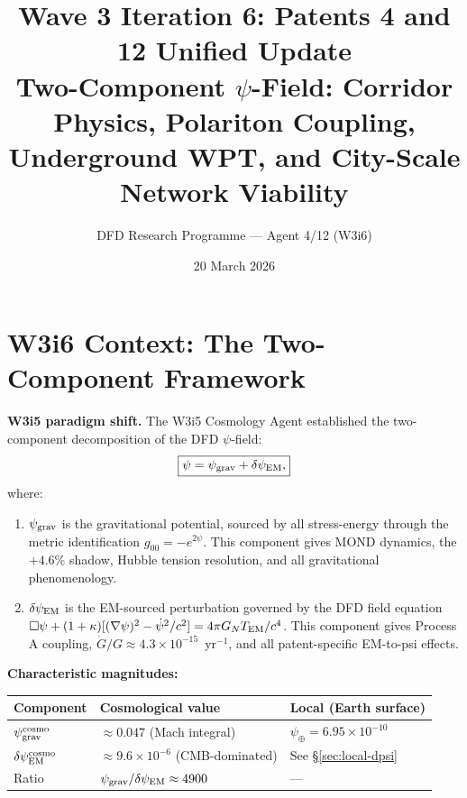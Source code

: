 \documentclass[11pt]{article}
\title{Wave 3 Iteration 6: Patents 4 and 12 Unified Update\\
\large Two-Component $\psi$-Field: Corridor Physics, Polariton Coupling,\\
Underground WPT, and City-Scale Network Viability}
\author{DFD Research Programme --- Agent 4/12 (W3i6)}
\date{20 March 2026}
\newcommand{\ee}[1]{\times 10^{#1}}
\newcommand{\psigrav}{\psi_{\rm grav}}
\newcommand{\dpsiEM}{\delta\psi_{\rm EM}}
\newcommand{\GN}{G_N}
\begin{document}
\maketitle
\tableofcontents
\newpage

\section{W3i6 Context: The Two-Component Framework}
\label{sec:context}

\noindent\textbf{W3i5 paradigm shift.} The W3i5 Cosmology Agent established the
two-component decomposition of the DFD $\psi$-field:
\begin{equation}
\boxed{\psi = \psigrav + \dpsiEM,}
\label{eq:two-component}
\end{equation}
where:
\begin{enumerate}
  \item $\psigrav$ is the gravitational potential, sourced by all stress-energy
    through the metric identification $g_{00} = -e^{2\psi}$. This component
    gives MOND dynamics, the $+4.6\%$ shadow, Hubble tension resolution,
    and all gravitational phenomenology.
  \item $\dpsiEM$ is the EM-sourced perturbation governed by the DFD field
    equation $\Box\psi + (1+\kappa)[(\nabla\psi)^2 - \dot\psi^2/c^2]
    = 4\pi \GN T_{\rm EM}/c^4$. This component gives Process A coupling,
    $\dot{G}/G \approx 4.3\ee{-15}$~yr$^{-1}$, and all patent-specific
    EM-to-psi effects.
\end{enumerate}

\noindent\textbf{Characteristic magnitudes:}
\begin{center}
\begin{tabular}{lll}
\toprule
Component & Cosmological value & Local (Earth surface) \\
\midrule
$\psigrav^{\rm cosmo}$ & $\approx 0.047$ (Mach integral) & $\psi_\oplus = 6.95\ee{-10}$ \\
$\dpsiEM^{\rm cosmo}$ & $\approx 9.6\ee{-6}$ (CMB-dominated) & See \S\ref{sec:local-dpsi} \\
Ratio & $\psigrav/\dpsiEM \approx 4900$ & --- \\
\bottomrule
\end{tabular}
\end{center}
\end{document}
